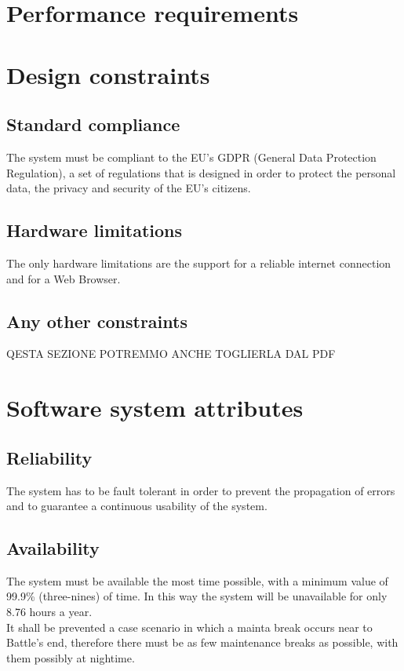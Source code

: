 \section{Performance requirements}
\label{sec:performance_requirements}%


\section{Design constraints}
\label{sec:design_constraints}%

\subsection{Standard compliance}
\label{subsec:standard compliance}%
The system must be compliant to the EU's GDPR (General Data Protection Regulation), a set of regulations that is designed in order to protect the personal data, the privacy and security of the EU's citizens. 

\subsection{Hardware limitations}
\label{subsec:hardware_limitations}%
The only hardware limitations are the support for a reliable internet connection and for a Web Browser.

\subsection{Any other constraints}
\label{subsec:other_constraints}%
QESTA SEZIONE POTREMMO ANCHE TOGLIERLA DAL PDF


\section{Software system attributes}
\label{sec:software_system_attributes}%

\subsection{Reliability}
\label{subsec:reliability}%
The system has to be fault tolerant in order to prevent the propagation of errors and to guarantee a continuous usability of the system.

\subsection{Availability}
\label{subsec:availability}%
The system must be available the most time possible, with a minimum value of 99.9\% (three-nines) of time. In this way the system will be unavailable for only 8.76 hours a year. \\
It shall be prevented a case scenario in which a mainta break occurs near to Battle's end, therefore there must be as few maintenance breaks as possible, with them possibly at nightime.


